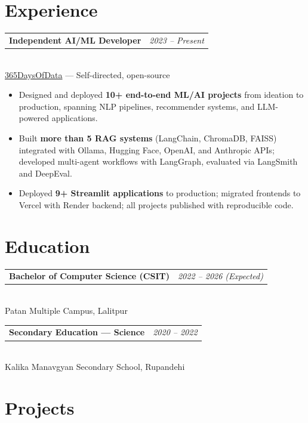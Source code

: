 \documentclass[10.5pt, a4paper]{article}
\makeatletter
\newcommand{\entryrow}[2]{%
  \begin{tabularx}{\linewidth}{@{}X r@{}}
    \textbf{#1} & \textit{\small #2}
  \end{tabularx}}
\makeatother
\begin{document}
\section{Experience}

\entryrow{Independent AI/ML Developer}{2023 -- Present}\\[-3pt]
{\small\color{mid}%
  \href{https://github.com/paudelsamir/365DaysOfData}{365DaysOfData}
  --- Self-directed, open-source}

\begin{itemize}
  \item Designed and deployed \textbf{10+ end-to-end ML/AI projects} from ideation to
        production, spanning NLP pipelines, recommender systems, and LLM-powered applications.
  \item Built \textbf{more than 5 RAG systems} (LangChain, ChromaDB, FAISS) integrated with Ollama,
        Hugging Face, OpenAI, and Anthropic APIs; developed multi-agent workflows
        with LangGraph, evaluated via LangSmith and DeepEval.
  \item Deployed \textbf{9+ Streamlit applications} to production; migrated frontends to
        Vercel with Render backend; all projects published with reproducible code.
\end{itemize}

\section{Education}

\entryrow{Bachelor of Computer Science (CSIT)}{2022 -- 2026 (Expected)}\\[-3pt]
{\small\color{mid}Patan Multiple Campus, Lalitpur}

\vspace{6pt}

\entryrow{Secondary Education --- Science}{2020 -- 2022}\\[-3pt]
{\small\color{mid}Kalika Manavgyan Secondary School, Rupandehi}

\section{Projects}
\end{document}
